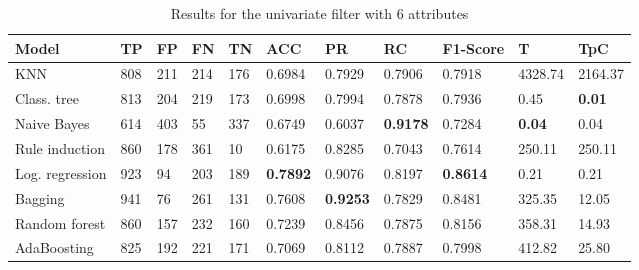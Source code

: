 \documentclass[a4paper,11pt]{article}
\begin{document}
\begin{table}
\centering
\begin{tabular}{|l|l|l|l|l|l|l|l|l|l|l|}
\hline

\textbf{Model} & \textbf{TP} & \textbf{FP} & \textbf{FN} & \textbf{TN} & \textbf{ACC} & \textbf{PR} & \textbf{RC} & \textbf{F1-Score} & \textbf{T} & \textbf{TpC} \\ \hline
KNN & 808 & 211 & 214 & 176 & 0.6984 & 0.7929 & 0.7906 & 0.7918 & 4328.74 & 2164.37 \\ \hline
Class. tree & 813 & 204 & 219 & 173 & 0.6998 & 0.7994 & 0.7878 & 0.7936 & 0.45 & \textbf{0.01} \\ \hline
Naive Bayes & 614 & 403 & 55 & 337 & 0.6749 & 0.6037 & \textbf{0.9178} & 0.7284 & \textbf{0.04} & 0.04 \\ \hline
Rule induction & 860 & 178 & 361 & 10 & 0.6175 & 0.8285 & 0.7043 & 0.7614 & 250.11 & 250.11 \\ \hline
Log. regression & 923 & 94 & 203 & 189 & \textbf{0.7892} & 0.9076 & 0.8197 & \textbf{0.8614} & 0.21 & 0.21 \\ \hline
Bagging & 941 & 76 & 261 & 131 & 0.7608 & \textbf{0.9253} & 0.7829 & 0.8481 & 325.35 & 12.05 \\ \hline
Random forest & 860 & 157 & 232 & 160 & 0.7239 & 0.8456 & 0.7875 & 0.8156 & 358.31 & 14.93 \\ \hline
AdaBoosting & 825 & 192 & 221 & 171 & 0.7069 & 0.8112 & 0.7887 & 0.7998 & 412.82 & 25.80 \\ \hline

\end{tabular}
\caption{Results for the univariate filter with 6 attributes}
\label{class:f25u}
\end{table}
\end{document}
